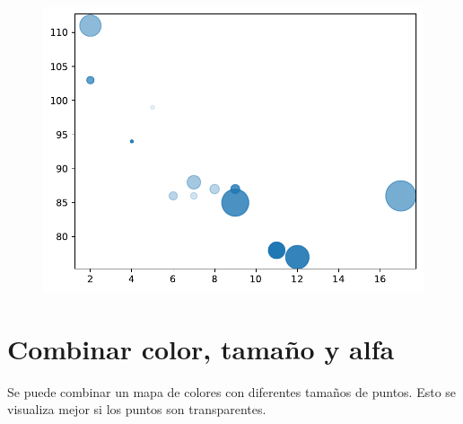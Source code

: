 \begin{code}
\begin{Shaded}
\begin{Highlighting}[]
\OperatorTok{=}\OperatorTok{=}
\end{Highlighting}
\end{Shaded}

\begin{figure}
  \centering
  \includegraphics[scale=0.6]{img/grafica1043.pdf}
\end{figure}
\end{code}

\section{Combinar color, tamaño y alfa}

Se puede combinar un mapa de colores con diferentes tamaños de puntos.
Esto se visualiza mejor si los puntos son transparentes.\\

